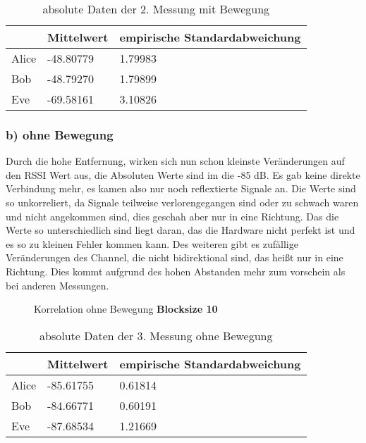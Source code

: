 \documentclass[12pt,a4paper]{article}
\begin{document}
\begin{table}[H]
\centering
\begin{tabular}{l|l|l}
& Mittelwert & empirische Standardabweichung \\
\hline
Alice & -48.80779 & 1.79983 \\
\hline
Bob & -48.79270 & 1.79899 \\
\hline
Eve & -69.58161 & 3.10826 \\
\end{tabular}
\caption{absolute Daten der 2. Messung mit Bewegung}
\end{table}

\subsubsection*{b) ohne Bewegung}
Durch die hohe Entfernung, wirken sich nun schon kleinste Veränderungen auf den RSSI Wert aus, die Absoluten Werte sind im die -85 dB. Es gab keine direkte Verbindung mehr, es kamen also nur noch reflextierte Signale an. Die Werte sind so unkorreliert, da Signale teilweise verlorengegangen sind oder zu schwach waren und nicht angekommen sind, dies geschah aber nur in eine Richtung. Das die Werte so unterschiedlich sind liegt daran, das die Hardware nicht perfekt ist und es so zu kleinen Fehler kommen kann. Des weiteren gibt es zufällige Veränderungen des Channel, die nicht bidirektional sind, das heißt nur in eine Richtung. Dies kommt aufgrund des hohen Abstanden mehr zum vorschein als bei anderen Messungen.

\begin{figure}[H]
\centering
{} \qquad
{}
\caption{Korrelation ohne Bewegung \textbf{Blocksize 10}}
\label{fig:3_b_o}
\end{figure}

\begin{table}[H]
\centering
\begin{tabular}{l|l|l}
& Mittelwert & empirische Standardabweichung \\
\hline
Alice & -85.61755 & 0.61814 \\
\hline
Bob & -84.66771 & 0.60191 \\
\hline
Eve & -87.68534 & 1.21669 \\
\end{tabular}
\caption{absolute Daten der 3. Messung ohne Bewegung}
\end{table}
\end{document}
